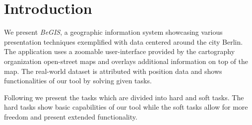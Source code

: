 \section*{Introduction}
We present \emph{BeGIS}, a geographic information system
showcasing various presentation techniques exemplified with
data centered around the city Berlin.
The application uses a zoomable user-interface provided
by the cartography organization open-street maps and overlays
additional information on top of the map.
The real-world dataset is
attributed with position data and shows functionalities of
our tool by solving given tasks.

Following we present the tasks which are divided into
hard and soft tasks. The hard tasks show basic capabilities
of our tool while the soft tasks allow for more freedom
and present extended functionality.
